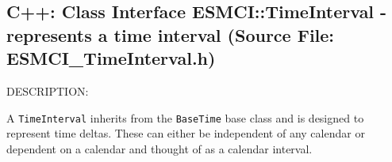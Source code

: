  
\setlength{\oldparskip}{\parskip}
\setlength{\parskip}{1.5ex}
\setlength{\oldparindent}{\parindent}
\setlength{\parindent}{0pt}
\setlength{\oldbaselineskip}{\baselineskip}
\setlength{\baselineskip}{11pt}
 
\def\bv{\begin{verbatim}}
\def\ev{\end{verbatim}}
\def\be{\begin{equation}}
\def\ee{\end{equation}}
\def\bea{\begin{eqnarray}}
\def\eea{\end{eqnarray}}
\def\bi{\begin{itemize}}
\def\ei{\end{itemize}}
\def\bn{\begin{enumerate}}
\def\en{\end{enumerate}}
\def\bd{\begin{description}}
\def\ed{\end{description}}
\def\({\left (}
\def\){\right )}
\def\[{\left [}
\def\]{\right ]}
\def\<{\left  \langle}
\def\>{\right \rangle}
\def\cI{{\cal I}}
\def\diag{\mathop{\rm diag}}
\def\tr{\mathop{\rm tr}}


 

  \subsection{C++:  Class Interface ESMCI::TimeInterval - represents a time interval (Source File: ESMCI\_TimeInterval.h)}


  
{\sf DESCRIPTION:\\ }


     A {\tt TimeInterval} inherits from the {\tt BaseTime} base class and is
     designed to represent time deltas. These can either be independent of
     any calendar or dependent on a calendar and thought of as a calendar
     interval. 
  
